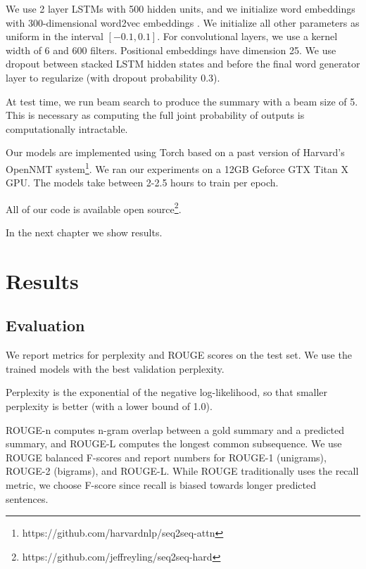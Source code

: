 \documentclass[12pt]{report}
\begin{document}
We use 2 layer LSTMs with 500 hidden units, and we initialize word embeddings with 300-dimensional word2vec embeddings \citep{mikolov2013word2vec}. We initialize all other parameters as uniform in the interval $[-0.1, 0.1]$. For convolutional layers, we use a kernel width of 6 and 600 filters. Positional embeddings have dimension 25. We use dropout \citep{Srivastava2014} between stacked LSTM hidden states and before the final word generator layer to regularize (with dropout probability 0.3).

At test time, we run beam search to produce the summary with a beam size of 5. This is necessary as computing the full joint probability of outputs is computationally intractable.




Our models are implemented using Torch \citep{Torch} based on a past version of Harvard's OpenNMT system\footnote{https://github.com/harvardnlp/seq2seq-attn}. We ran our experiments on a 12GB Geforce GTX Titan X GPU.
The models take between 2-2.5 hours to train per epoch.

All of our code is available open source\footnote{https://github.com/jeffreyling/seq2seq-hard}.

In the next chapter we show results.

\chapter{Results}
\label{chap:results}

\section{Evaluation}

We report metrics for perplexity and ROUGE scores \citep{lin2004rouge} on the test set. We use the trained models with the best validation perplexity.

Perplexity is the exponential of the negative log-likelihood, so that smaller perplexity is better (with a lower bound of 1.0).

ROUGE-n computes n-gram overlap between a gold summary and a predicted summary, and ROUGE-L computes the longest common subsequence.
We use ROUGE balanced F-scores and report numbers for ROUGE-1 (unigrams), ROUGE-2 (bigrams), and ROUGE-L. While ROUGE traditionally uses the recall metric, we choose F-score since recall is biased towards longer predicted sentences.
\end{document}
